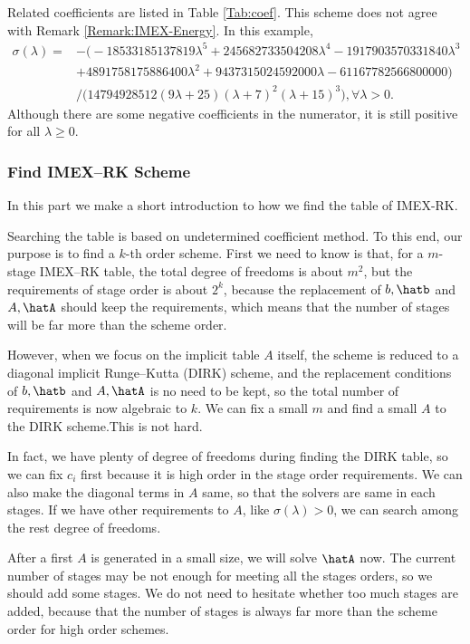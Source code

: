 Related coefficients are listed in Table \ref{Tab:coef}. 
This scheme does not agree with Remark \ref{Remark:IMEX-Energy}. 
 In this example,
\begin{align*}
\sigma(\lambda) = &-\Big(- 18533185137819\lambda^5 + 245682733504208\lambda^4 - 1917903570331840\lambda^3 \\
&+ 4891758175886400\lambda^2 + 9437315024592000\lambda - 61167782566800000\Big)\\
&/\Big(14794928512(9\lambda + 25)(\lambda + 7)^2(\lambda + 15)^3\Big) , \forall \lambda > 0.
\end{align*}
Although there are some negative coefficients in the numerator, it is still positive for all $\lambda \geq 0$.

\subsubsection{Find IMEX--RK Scheme}

In this part we make a short introduction to how we find the table of IMEX-RK.

Searching the table is based on undetermined coefficient method.
To this end, our purpose is to find a $k$-th order scheme.
First we need to know is that, for a $m$-stage IMEX--RK table, the total degree of freedoms is about $m^2$,
but the requirements of stage order is about $2^k$,
because the replacement of $b, \hatb$ and $A, \hatA$ should keep the requirements,
which means that the number of stages will be far more than the scheme order.

However, when we focus on the implicit table $A$ itself, the scheme is reduced to a diagonal implicit Runge--Kutta (DIRK)
scheme, and the replacement conditions of $b, \hatb$ and $A, \hatA$ is no need to be kept, so the total number of requirements is now algebraic to $k$.
We can fix a small $m$ and find a small $A$ to the DIRK scheme.This is not hard.

In fact, we have plenty of degree of freedoms during finding the DIRK table,
so we can fix $c_i$ first because it is high order in the stage order requirements.
We can also make the diagonal terms in $A$ same, so that the solvers are same in each stages.
If we have other requirements to $A$, like $\sigma(\lambda)>0$,
we can search among the rest degree of freedoms.

After a first $A$ is generated in a small size, we will solve $\hatA$ now.
The current number of stages may be not enough for meeting all the stages orders,
so we should add some stages.
We do not need to hesitate whether too much stages are added, because that the number of stages is always far more than the scheme order for high order schemes.

